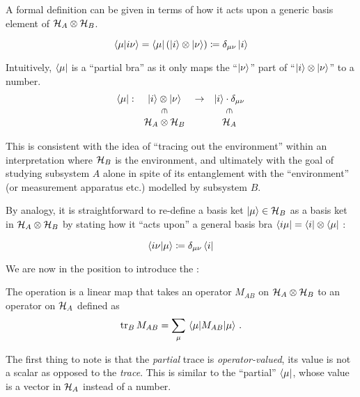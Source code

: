A formal definition can be given in terms of how it acts upon a generic
basis element of $\mathcal{H}_A\otimes\mathcal{H}_B$.

\begin{definition}\label{def:pBra}
\[
  \braket{\mu}{i\nu} = \bra{\mu}\left(\ket{i}\otimes\ket{\nu}\right) \coloneqq \delta_{\mu\nu}\ket{i}
\]
\end{definition}

Intuitively, $\bra{\mu}$ is a ``partial bra''
as it only maps the ``$\ket{\nu}$'' part of
``$\ket{i}\otimes\ket{\nu}$''
to a number.
\[
  \begin{array}{cccc}
    \bra{\mu}:  & \ket{i}\ox\ket{\nu}                   & \rightarrow & \ket{i}\cdot\delta_{\mu\nu}           \\
                & \rotatebox[origin=c]{270}{$\in$}      &             & \rotatebox[origin=c]{270}{$\in$}      \\
                & \hilb{H}_A\ox\hilb{H}_B               &             & \hilb{H}_A
  \end{array}
\]

This is consistent with the idea of
``tracing out the environment'' within an interpretation where
$\mathcal{H}_B$ is the environment, and ultimately with the goal of
studying subsystem $A$ alone in spite of its entanglement with the 
``environment'' (or measurement apparatus etc.) modelled by
subsystem $B$.

By analogy, it is straightforward to re-define a basis ket $\ket{\mu} \in \mathcal{H}_B$
as a basis ket in $\mathcal{H}_A \otimes \mathcal{H}_B$ by stating how it ``acts upon''
a general basis bra $\bra{i\mu} = \bra{i}\otimes\bra{\mu}$ :
\begin{definition}\label{def:pKet}
  \[
    \braket{i\nu}{\mu} \coloneqq \delta_{\mu\nu}\bra{i}
  \]
\end{definition}

We are now in the position to introduce the :
\begin{definition}\label{def:pTr}
  The  operation
  is a linear map
  that takes an operator
  $M_{AB}$ on $\mathcal{H}_A \otimes \mathcal{H}_B$
  to an operator on $\mathcal{H}_A$ defined as
  \[
    \tr_B M_{AB} = \sum_{\mu} \matrixel{\mu}{M_{AB}}{\mu}
    \, \text{.}
  \]
\end{definition}

The first thing to note is that the \emph{partial} trace is \emph{operator-valued},
its value is not a scalar as opposed to the \emph{trace}.
This is similar to the ``partial'' $\bra{\mu}$, whose value is a vector in $\mathcal{H}_A$
instead of a number.

